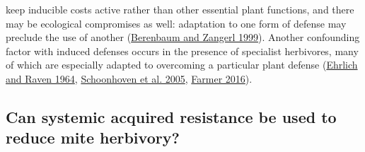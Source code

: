\documentclass[12pt,final,CPage]{ufthesis}
\begin{document}
{keep inducible costs active rather than other essential plant functions, and there may be ecological compromises as well: adaptation to one form of defense may preclude the use of another (\protect\hyperlink{ref-Berenbaum1999}{Berenbaum and Zangerl 1999}). Another confounding factor with induced defenses occurs in the presence of specialist herbivores, many of which are especially adapted to overcoming a particular plant defense (\protect\hyperlink{ref-Ehrlich1964}{Ehrlich and Raven 1964}, \protect\hyperlink{ref-Schoonhoven2005}{Schoonhoven et al. 2005}, \protect\hyperlink{ref-Farmer2016}{Farmer 2016}).

  \hypertarget{litrev-sar}{%
  \subsection{Can systemic acquired resistance be used to reduce mite herbivory?}\label{litrev-sar}}

}
\end{document}
